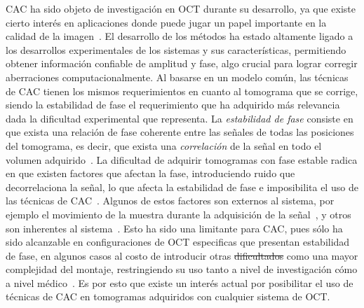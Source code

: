 \documentclass[letter, 12 pt]{article}
\providecommand{\DIFaddtex}[1]{{\protect\color{blue}\uwave{#1}}} %
\providecommand{\DIFdeltex}[1]{{\protect\color{red}\sout{#1}}}                      %
\providecommand{\DIFaddbegin}{} %
\providecommand{\DIFaddend}{} %
\providecommand{\DIFdelbegin}{} %
\providecommand{\DIFdelend}{} %
\providecommand{\DIFadd}[1]{\texorpdfstring{\DIFaddtex{#1}}{#1}} %
\providecommand{\DIFdel}[1]{\texorpdfstring{\DIFdeltex{#1}}{}} %
\newcommand{\DIFscaledelfig}{0.5}
\newlength{\DIFdelgraphicswidth} %
\newlength{\DIFdelgraphicsheight} %
\newcommand{\DIFaddincludegraphics}[2][]{{\color{blue}\fbox{\DIFOincludegraphics[#1]{#2}}}} %
\newcommand{\DIFdelincludegraphics}[2][]{%
\sbox{\DIFdelgraphicsbox}{\DIFOincludegraphics[#1]{#2}}%
\settoboxwidth{\DIFdelgraphicswidth}{\DIFdelgraphicsbox} %
\settoboxtotalheight{\DIFdelgraphicsheight}{\DIFdelgraphicsbox} %
\scalebox{\DIFscaledelfig}{%
\parbox[b]{\DIFdelgraphicswidth}{\usebox{\DIFdelgraphicsbox}\\[-\baselineskip] \rule{\DIFdelgraphicswidth}{0em}}\llap{\resizebox{\DIFdelgraphicswidth}{\DIFdelgraphicsheight}{%
\setlength{\unitlength}{\DIFdelgraphicswidth}%
\begin{picture}(1,1)%
\thicklines\linethickness{2pt} %
{\color[rgb]{1,0,0}\put(0,0){\framebox(1,1){}}}%
{\color[rgb]{1,0,0}\put(0,0){\line( 1,1){1}}}%
{\color[rgb]{1,0,0}\put(0,1){\line(1,-1){1}}}%
\end{picture}%
}\hspace*{3pt}}} %
} %
\DeclareRobustCommand{\DIFaddbegin}{\DIFOaddbegin \let\includegraphics\DIFaddincludegraphics} %
\DeclareRobustCommand{\DIFaddend}{\DIFOaddend \let\includegraphics\DIFOincludegraphics} %
\DeclareRobustCommand{\DIFdelbegin}{\DIFOdelbegin \let\includegraphics\DIFdelincludegraphics} %
\DeclareRobustCommand{\DIFdelend}{\DIFOaddend \let\includegraphics\DIFOincludegraphics} %
\begin{document}
CAC ha sido objeto de investigación en OCT durante su desarrollo, ya que existe cierto interés en aplicaciones donde puede jugar un papel importante en la calidad de la imagen~\cite{liu2017}. El desarrollo de los métodos ha estado altamente ligado a los desarrollos experimentales de los sistemas y sus características, permitiendo obtener información confiable de amplitud y fase, algo crucial para lograr corregir aberraciones computacionalmente. Al basarse en un modelo común, las técnicas de CAC tienen los mismos requerimientos en cuanto al tomograma que se corrige, siendo la estabilidad de fase el requerimiento que ha adquirido más relevancia dada la dificultad experimental que representa. La \textit{estabilidad de fase} consiste en que exista una relación de fase coherente entre las señales de todas las posiciones del tomograma, es decir, que exista una \textit{correlación} de la señal en todo el volumen adquirido~\cite{Shemonski2014_Stability}. La dificultad de adquirir tomogramas con fase estable radica en que existen factores que afectan la fase, introduciendo ruido que decorrelaciona la señal, lo que afecta la estabilidad de fase e imposibilita el uso de las técnicas de CAC~\cite{Shemonski2014_Stability}. Algunos de estos factores son externos al sistema, por ejemplo el movimiento de la muestra durante la adquisición de la señal~\cite{shemonskiStabilityComputedOptical2014}, y otros son inherentes al sistema~\cite{Vakoc2005_Phase}. Esto ha sido una limitante para CAC, pues sólo ha sido alcanzable en configuraciones de OCT especificas que presentan estabilidad de fase, en algunos casos al costo de introducir otras \DIFdelbegin \DIFdel{dificultados }\DIFdelend \DIFaddbegin \DIFadd{dificultades }\DIFaddend como una mayor complejidad del montaje, restringiendo su uso tanto a nivel de investigación cómo a nivel médico~\cite{Shemonski2014_Stability, liu2017}. Es por esto que existe un interés actual por posibilitar el uso de técnicas de CAC en tomogramas adquiridos con cualquier sistema de OCT. \\

\end{document}
